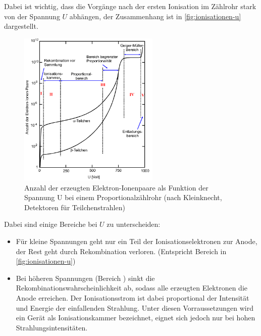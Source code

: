 \noindent
Dabei ist wichtig, dass die Vorgänge nach der ersten Ionisation im Zählrohr stark von der Spannung $U$ 
abhängen, der Zusammenhang ist in \autoref{fig:ionisationen-u} dargestellt.
\begin{figure}
	\centering
	\includegraphics[width=0.6\textwidth]{content/ionisationen-u.png}
	\caption{Anzahl der erzeugten Elektron-Ionenpaare als Funktion der Spannung U bei einem
	Proportionalzählrohr (nach Kleinknecht, Detektoren für Teilchenstrahlen) \cite{sample}}
	\label{fig:ionisationen-u}
\end{figure}
Dabei sind einige Bereiche bei $U$ zu unterscheiden:
\begin{itemize}
	\item Für kleine Spannungen geht nur ein Teil der Ionisationselektronen zur Anode, der Rest geht 
		durch Rekombination verloren. (Entspricht Bereich  in \autoref{fig:ionisationen-u})
	\item Bei höheren Spannungen (Bereich ) 
		sinkt die Rekombinationswahrscheinlichkeit ab, sodass alle erzeugten Elektronen
		die Anode erreichen. Der Ionisationsstrom ist dabei proportional der Intensität und Energie
		der einfallenden Strahlung. Unter diesen Vorraussetzungen wird ein Gerät als Ionisationskammer
		bezeichnet, eignet sich jedoch nur bei hohen Strahlungsintensitäten.
\end{itemize}
